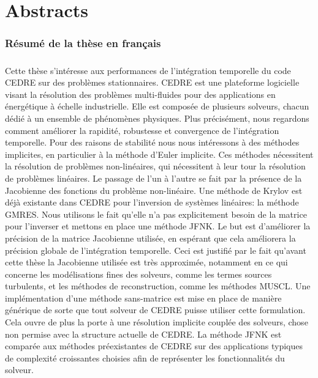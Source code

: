 \chapter*{Abstracts}

  \subsection*{Résumé de la thèse en français}

    \paragraph{}
    Cette thèse s'intéresse aux performances de l'intégration temporelle du code CEDRE sur des problèmes stationnaires.
    CEDRE est une plateforme logicielle visant la résolution des problèmes multi-fluides pour des applications en énergétique à échelle industrielle.
    Elle est composée de plusieurs solveurs, chacun dédié à un ensemble de phénomènes physiques.
    Plus précisément, nous regardons comment améliorer la rapidité, robustesse et convergence de l’intégration temporelle.
    Pour des raisons de stabilité nous nous intéressons à des méthodes implicites, en particulier à la méthode d'Euler implicite.
    Ces méthodes nécessitent la résolution de problèmes non-linéaires, qui nécessitent à leur tour la résolution de problèmes linéaires.
    Le passage de l'un à l'autre se fait par la présence de la Jacobienne des fonctions du problème non-linéaire.
    Une méthode de Krylov est déjà existante dans CEDRE pour l'inversion de systèmes linéaires: la méthode GMRES.
    Nous utilisons le fait qu'elle n'a pas explicitement besoin de la matrice pour l'inverser et mettons en place une méthode JFNK.
    Le but est d'améliorer la précision de la matrice Jacobienne utilisée, en espérant que cela améliorera la précision globale de l'intégration temporelle.
    Ceci est justifié par le fait qu'avant cette thèse la Jacobienne utilisée est très approximée, notamment en ce qui concerne les modélisations fines des solveurs, comme les termes sources turbulents, et les méthodes de reconstruction, comme les méthodes MUSCL.
    Une implémentation d'une méthode sans-matrice est mise en place de manière générique de sorte que tout solveur de CEDRE puisse utiliser cette formulation.
    Cela ouvre de plus la porte à une résolution implicite couplée des solveurs, chose non permise avec la structure actuelle de CEDRE.
    La méthode JFNK est comparée aux méthodes préexistantes de CEDRE sur des applications typiques de complexité croissantes choisies afin de représenter les fonctionnalités du solveur.

